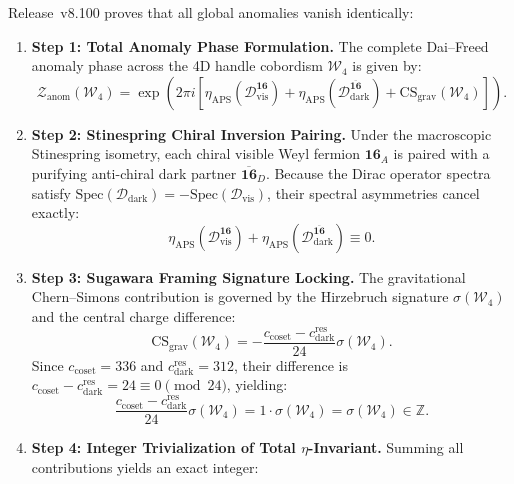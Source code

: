 \documentclass[11pt,onecolumn]{article}
\begin{document}
Release~v8.100 proves that all global anomalies vanish identically:
\begin{enumerate}
    \item \textbf{Step 1: Total Anomaly Phase Formulation.} The complete Dai--Freed anomaly phase across the 4D handle cobordism $\mathcal{W}_4$ is given by:
    \begin{equation}
    \mathcal{Z}_{\text{anom}}(\mathcal{W}_4) = \exp\left(2\pi i \left[\eta_{\text{APS}}(\mathcal{D}_{\text{vis}}^{\mathbf{16}}) + \eta_{\text{APS}}(\mathcal{D}_{\text{dark}}^{\overline{\mathbf{16}}}) + \text{CS}_{\text{grav}}(\mathcal{W}_4)\right]\right).
    \label{eq:v8_49}
    \end{equation}
    \item \textbf{Step 2: Stinespring Chiral Inversion Pairing.} Under the macroscopic Stinespring isometry, each chiral visible Weyl fermion $\mathbf{16}_A$ is paired with a purifying anti-chiral dark partner $\overline{\mathbf{16}}_D$. Because the Dirac operator spectra satisfy $\text{Spec}(\mathcal{D}_{\text{dark}}) = -\text{Spec}(\mathcal{D}_{\text{vis}})$, their spectral asymmetries cancel exactly:
    \begin{equation}
    \eta_{\text{APS}}(\mathcal{D}_{\text{vis}}^{\mathbf{16}}) + \eta_{\text{APS}}(\mathcal{D}_{\text{dark}}^{\overline{\mathbf{16}}}) \equiv 0.
    \label{eq:v8_50}
    \end{equation}
    \item \textbf{Step 3: Sugawara Framing Signature Locking.} The gravitational Chern--Simons contribution is governed by the Hirzebruch signature $\sigma(\mathcal{W}_4)$ and the central charge difference:
    \begin{equation}
    \text{CS}_{\text{grav}}(\mathcal{W}_4) = -\frac{c_{\text{coset}} - c_{\text{dark}}^{\text{res}}}{24} \sigma(\mathcal{W}_4).
    \end{equation}
    Since $c_{\text{coset}} = 336$ and $c_{\text{dark}}^{\text{res}} = 312$, their difference is $c_{\text{coset}} - c_{\text{dark}}^{\text{res}} = 24 \equiv 0 \pmod{24}$, yielding:
    \begin{equation}
    \frac{c_{\text{coset}} - c_{\text{dark}}^{\text{res}}}{24} \sigma(\mathcal{W}_4) = 1 \cdot \sigma(\mathcal{W}_4) = \sigma(\mathcal{W}_4) \in \mathbb{Z}.
    \label{eq:v8_51}
    \end{equation}
    \item \textbf{Step 4: Integer Trivialization of Total $\eta$-Invariant.} Summing all contributions yields an exact integer:
    \begin{equation}

\end{equation}
\end{enumerate}
\end{document}
